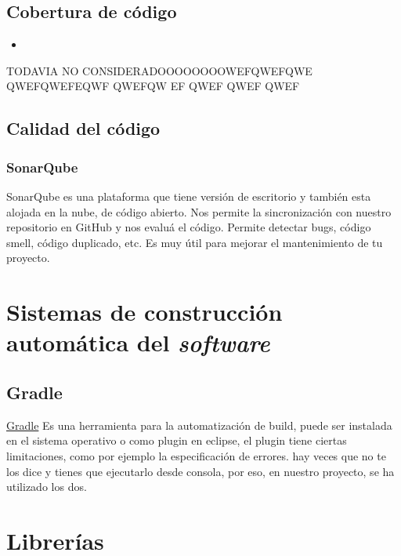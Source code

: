 \subsection{Cobertura de código}\label{cobertura-de-codigo}

\begin{itemize}
	\tightlist
	\item
\end{itemize}

TODAVIA NO CONSIDERADOOOOOOOOWEFQWEFQWE
QWEFQWEFEQWF
QWEFQW
EF
QWEF
QWEF
QWEF



\subsection{Calidad del código}\label{calidad-del-codigo}

\subsubsection{SonarQube}\label{sonarqube}

SonarQube es una plataforma que tiene versión de escritorio y también esta alojada en la nube, de código abierto. Nos permite la sincronización con nuestro repositorio en GitHub y nos evaluá el código. Permite detectar bugs, código smell, código duplicado, etc. Es muy útil para mejorar el mantenimiento de tu proyecto. \cite{web:sonarqube}

\section{Sistemas de construcción automática del
	\emph{software}}\label{sistemas-de-construccion-automuxe1tica-del-software}



\subsection{Gradle}\label{gradle}
\href{https://gradle.org/}{Gradle} Es una herramienta para la automatización de build, puede ser instalada en el sistema operativo o como plugin en eclipse, el plugin tiene ciertas limitaciones, como por ejemplo la especificación de errores. hay veces que no te los dice y tienes que ejecutarlo desde consola, por eso, en nuestro proyecto, se ha utilizado los dos.


\section{Librerías}\label{libreruxedas}


